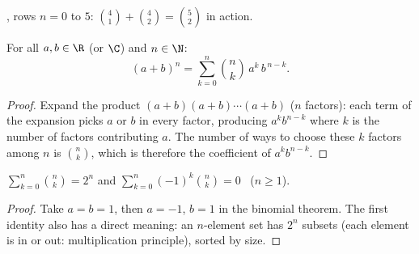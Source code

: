 \begin{omfigure}

{\small {}, rows $n = 0$ to $5$: 
$\binom{4}{1} + \binom{4}{2} = \binom{5}{2}$ in action.}
\end{omfigure}

\begin{theorem}\label{thm:g12:comb:binomial}
For all $a, b \in \R$ (or $\C$) and $n \in \N$:
\[
(a+b)^n = \sum_{k=0}^{n} \binom{n}{k}\, a^{k}\, b^{\,n-k} .
\]
\end{theorem}

\begin{proof}
Expand the product $(a+b)(a+b)\cdots(a+b)$ ($n$ factors): each term of the
expansion picks $a$ or $b$ in every factor, producing $a^k b^{n-k}$ where
$k$ is the number of factors contributing $a$. The number of ways to choose
these $k$ factors among $n$ is $\binom nk$, which is therefore the
coefficient of $a^k b^{n-k}$.
\end{proof}

\begin{corollary}\label{cor:g12:comb:sums}
$\displaystyle\sum_{k=0}^{n} \binom{n}{k} = 2^n$
\quad and \quad
$\displaystyle\sum_{k=0}^{n} (-1)^k\binom{n}{k} = 0$ \ ($n \geq 1$).
\end{corollary}

\begin{proof}
Take $a = b = 1$, then $a = -1$, $b = 1$ in the binomial theorem. The first
identity also has a direct meaning: an $n$-element set has $2^n$ subsets
(each element is in or out: multiplication principle), sorted by size.
\end{proof}

